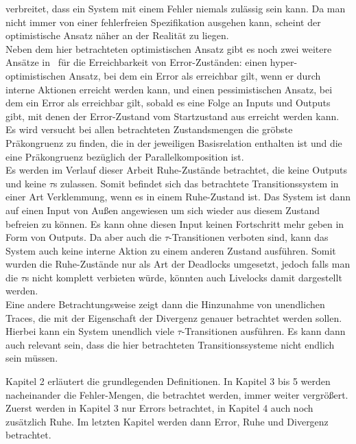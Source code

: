 verbreitet, dass ein System mit einem Fehler niemals zulässig sein kann. Da man
nicht immer von einer fehlerfreien Spezifikation ausgehen kann, scheint der
optimistische Ansatz näher an der Realität zu liegen.\\
Neben dem hier betrachteten optimistischen Ansatz gibt es noch zwei weitere
Ansätze in~\cite{Vogler2014EIO} für die Erreichbarkeit von Error-Zuständen:
einen hyper-optimistischen Ansatz, bei dem ein Error als erreichbar gilt, wenn
er durch interne Aktionen erreicht werden kann, und einen pessimistischen
Ansatz, bei dem ein Error als erreichbar gilt, sobald es eine Folge an Inputs
und Outputs gibt, mit denen der Error-Zustand vom Startzustand aus erreicht
werden kann.\\
Es wird versucht bei allen betrachteten Zustandsmengen die gröbste Präkongruenz zu
finden, die in der jeweiligen Basisrelation enthalten ist und die eine
Präkongruenz bezüglich der Parallelkomposition ist.\\
Es werden im Verlauf dieser Arbeit Ruhe-Zustände betrachtet, die keine Outputs
und keine $\tau$s zulassen. Somit befindet sich das betrachtete
Transitionssystem in einer Art Verklemmung, wenn es in einem Ruhe-Zustand ist.
Das System ist dann auf einen Input von Außen angewiesen um sich wieder aus
diesem Zustand befreien zu können. Es kann ohne diesen Input keinen Fortschritt
mehr geben in Form von Outputs. Da aber auch die $\tau$-Transitionen verboten
sind, kann das System auch keine interne Aktion zu einem anderen Zustand
ausführen. Somit wurden die Ruhe-Zustände nur als Art der Deadlocks umgesetzt,
jedoch falls man die $\tau$s nicht komplett verbieten würde, könnten auch
Livelocks damit dargestellt werden.\\
Eine andere Betrachtungsweise zeigt dann die Hinzunahme von unendlichen Traces,
die mit der Eigenschaft der Divergenz genauer betrachtet werden sollen. Hierbei
kann ein System unendlich viele $\tau$-Transitionen ausführen. Es kann dann
auch relevant sein, dass die hier betrachteten Transitionssysteme nicht endlich sein
müssen.

Kapitel 2 erläutert die grundlegenden Definitionen. In Kapitel 3 bis 5 werden
nacheinander die Fehler-Mengen, die betrachtet werden, immer weiter vergrößert.
Zuerst werden in Kapitel 3 nur Errors betrachtet, in Kapitel 4 auch noch
zusätzlich Ruhe. Im letzten Kapitel werden dann Error, Ruhe und Divergenz
betrachtet.
